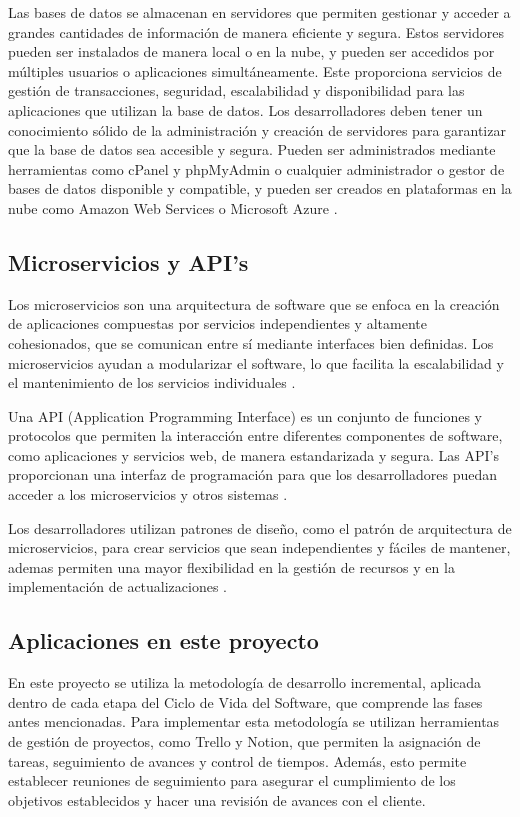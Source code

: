 \documentclass[runningheads]{llncs}
\begin{document}
            Las bases de datos se almacenan en servidores que permiten gestionar y acceder a grandes cantidades de información de manera eficiente y segura. Estos servidores pueden ser instalados de manera local o en la nube, y pueden ser accedidos por múltiples usuarios o aplicaciones simultáneamente. Este proporciona servicios de gestión de transacciones, seguridad, escalabilidad y disponibilidad para las aplicaciones que utilizan la base de datos. Los desarrolladores deben tener un conocimiento sólido de la administración y creación de servidores para garantizar que la base de datos sea accesible y segura. Pueden ser administrados mediante herramientas como cPanel y phpMyAdmin o cualquier administrador o gestor de bases de datos disponible y compatible, y pueden ser creados en plataformas en la nube como Amazon Web Services o Microsoft Azure \cite{Cita14}.


        \subsection{Microservicios y API’s}
            Los microservicios son una arquitectura de software que se enfoca en la creación de aplicaciones compuestas por servicios independientes y altamente cohesionados, que se comunican entre sí mediante interfaces bien definidas. Los microservicios ayudan a modularizar el software, lo que facilita la escalabilidad y el mantenimiento de los servicios individuales \cite{Cita15}.

            Una API (Application Programming Interface) es un conjunto de funciones y protocolos que permiten la interacción entre diferentes componentes de software, como aplicaciones y servicios web, de manera estandarizada y segura. Las API’s proporcionan una interfaz de programación para que los desarrolladores puedan acceder a los microservicios y otros sistemas \cite{Cita16}.

            Los desarrolladores utilizan patrones de diseño, como el patrón de arquitectura de microservicios, para crear servicios que sean independientes y fáciles de mantener, ademas permiten una mayor flexibilidad en la gestión de recursos y en la implementación de actualizaciones .

        \subsection{Aplicaciones en este proyecto}

            En este proyecto se utiliza la metodología de desarrollo incremental, aplicada dentro de cada etapa del Ciclo de Vida del Software, que comprende las fases antes mencionadas. Para implementar esta metodología se utilizan herramientas de gestión de proyectos, como Trello y Notion, que permiten la asignación de tareas, seguimiento de avances y control de tiempos. Además, esto permite establecer reuniones de seguimiento para asegurar el cumplimiento de los objetivos establecidos y hacer una revisión de avances con el cliente.
\end{document}
